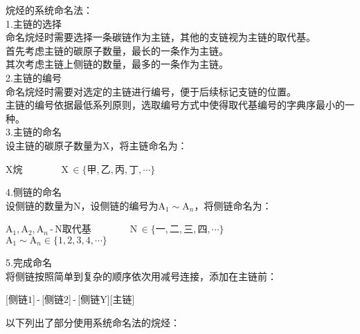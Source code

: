 \documentclass[UTF8]{ctexart}
\begin{document}
    烷烃的系统命名法：\\[4mm]
    1.主链的选择\\[3mm]
    命名烷烃时需要选择一条碳链作为主链，其他的支链视为主链的取代基。\\[3mm]
    首先考虑主链的碳原子数量，最长的一条作为主链。\\[3mm]
    其次考虑主链上侧链的数量，最多的一条作为主链。\\[6mm]
    2.主链的编号\\[3mm]
    命名烷烃时需要对选定的主链进行编号，便于后续标记支链的位置。\\[3mm]
    主链的编号依据最低系列原则，选取编号方式中使得取代基编号的字典序最小的一种。\\[6mm]
    3.主链的命名\\[3mm]
    设主链的碳原子数量为X，将主链命名为：
    \begin{center}
        X烷~~~~~~~~X\,$\in\big\{\text{甲},\text{乙},\text{丙},\text{丁},\cdots\big\}$
    \end{center}\vspace{10pt}
    4.侧链的命名\\[3mm]
    设侧链的数量为N，设侧链的编号为$\text{A}_1\sim \text{A}_n$，将侧链命名为：\vspace{2pt}
    \begin{center}
        $\text{A}_1,\text{A}_2,\text{A}_n$\,-\,N取代基~~~~~~~~N\,$\in\big\{\text{一},\text{二},\text{三},\text{四},\cdots\big\}$~~~~~~~~$\text{A}_1\sim \text{A}_n\in\big\{1,2,3,4,\cdots\big\}$
    \end{center}\vspace{15pt}
    5.完成命名\\[3mm]
    将侧链按照简单到复杂的顺序依次用减号连接，添加在主链前：
    \begin{center}
        [侧链$1$]\,-\,[侧链$2$]\,-\,[侧链Y][主链]
    \end{center}\vspace{25pt}
    以下列出了部分使用系统命名法的烷烃：\vspace{5pt}
    \begin{center}
        \qquad\quad
    \end{center}
    
\end{document}
